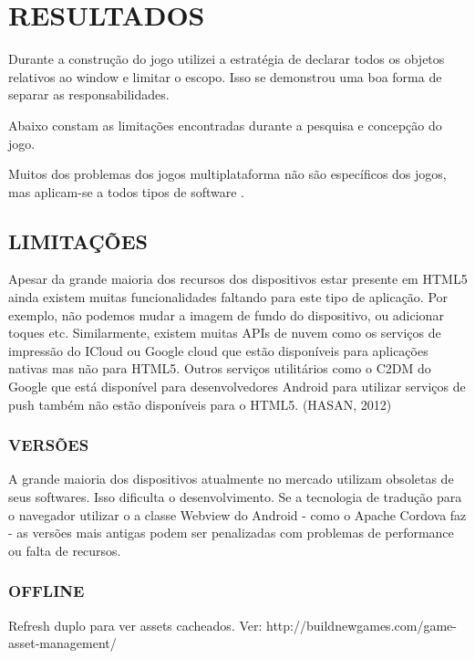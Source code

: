 \documentclass[
12pt,
a4paper,
portuges,
draft
]{report}
\begin{document}

\chapter{RESULTADOS}
\thispagestyle{myheadings}

Durante a construção do jogo utilizei a estratégia de declarar todos
os objetos relativos ao window e limitar o escopo. Isso se demonstrou uma boa forma de separar as responsabilidades.

Abaixo constam as limitações encontradas durante a pesquisa e concepção do jogo.

Muitos dos problemas dos jogos multiplataforma não são específicos
dos jogos, mas aplicam-se a todos tipos de software  \parencite{currentStateCrossPlatform}.

\section{LIMITAÇÕES}

Apesar da grande maioria dos recursos dos dispositivos estar presente
em HTML5 ainda existem muitas funcionalidades faltando para este tipo
de aplicação. Por exemplo, não podemos mudar a imagem de fundo do
dispositivo, ou adicionar toques etc. Similarmente, existem muitas
APIs de nuvem como os serviços de impressão do ICloud ou Google
cloud que estão disponíveis para aplicações nativas mas não para
HTML5. Outros serviços utilitários como o C2DM do Google que está
disponível para desenvolvedores Android para utilizar serviços de push
também não estão disponíveis para o HTML5. (HASAN, 2012)

\subsection{VERSÕES}
A grande maioria dos dispositivos atualmente no mercado utilizam
obsoletas de seus softwares. Isso dificulta o desenvolvimento. Se a
tecnologia de tradução para o navegador utilizar o a classe Webview do
Android - como o Apache Cordova faz - as versões mais antigas podem ser
penalizadas com problemas de performance ou falta de recursos.

\subsection{OFFLINE}

Refresh duplo para ver assets cacheados. Ver:
http://buildnewgames.com/game-asset-management/
\end{document}
